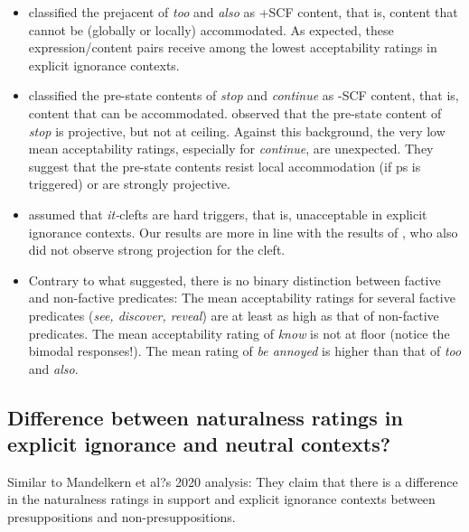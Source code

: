 \documentclass[11pt,fleqn]{article}
\newcommand{\6}{\mbox{$[\hspace*{-.6mm}[$}}
\newcommand{\9}{\mbox{$]\hspace*{-.6mm}]$}}
\begin{document}
\begin{itemize}

\item \citealt{brst-lang11} classified the prejacent of {\em too} and {\em also} as +SCF content, that is, content that cannot be (globally or locally) accommodated. As expected, these expression/content pairs receive among the lowest acceptability ratings in explicit ignorance contexts.

\item \citealt{brst-lang11} classified the pre-state contents of {\em stop} and {\em continue} as -SCF content, that is, content that can be accommodated. \citealt{tbd-variability} observed that the pre-state content of {\em stop} is projective, but not at ceiling. Against this background, the very low mean acceptability ratings, especially for {\em continue}, are unexpected. They suggest that the pre-state contents resist local accommodation (if ps is triggered) or are strongly projective.

\item \citealt{abusch10} assumed that {\em it-}clefts are hard triggers, that is, unacceptable in explicit ignorance contexts. Our results are more in line with the results of \citealt{smith-hall-cls}, who also did not observe strong projection for the cleft.

\item Contrary to what \citealt{mandelkern-etal2020} suggested, there is no binary distinction between factive and non-factive predicates: The mean acceptability ratings for several factive predicates ({\em see, discover, reveal}) are at least as high as that of non-factive predicates.  The mean acceptability rating of {\em know} is not at floor (notice the bimodal responses!). The mean rating of {\em be annoyed} is higher than that of {\em too} and {\em also}.

\end{itemize}

\newpage

\subsection{Difference between naturalness ratings in explicit ignorance and neutral contexts?}

Similar to Mandelkern et al?s 2020 analysis: They claim that there is a difference in the naturalness ratings in support and explicit ignorance contexts between presuppositions and non-presuppositions.
\end{document}
